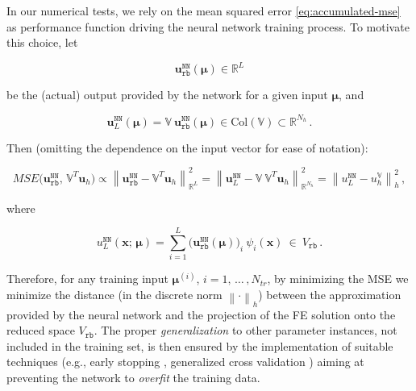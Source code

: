 \documentclass[longtitle]{elsarticle}
\numberwithin{equation}{section}
\theoremstyle{theorem}
\theoremstyle{definition}
\theoremstyle{remark}
\theoremstyle{proposition}
\numberwithin{figure}{section}
\newcommand{\norm}[1]{\left\lVert#1\right\rVert}
\newcommand{\bg}[1]{\boldsymbol{#1}}
\begin{document}
		In our numerical tests, we rely on the mean squared error \eqref{eq:accumulated-mse} as performance function driving the neural network training process. To motivate this choice, let 
		\begin{linenomath}\begin{equation*}
			\mathbf{u}_{\texttt{rb}}^{\texttt{NN}}(\bg{\mu}) \in \mathbb{R}^L
		\end{equation*}\end{linenomath}
		be the (actual) output provided by the network for a given input $\bg{\mu}$, and 
		\begin{linenomath}\begin{equation*}
			\mathbf{u}_L^{\texttt{NN}}(\bg{\mu}) = \mathbb{V} ~ \mathbf{u}_{\texttt{rb}}^{\texttt{NN}}(\bg{\mu}) \in \text{Col}(\mathbb{V}) \subset \mathbb{R}^{N_h} \, . 
		\end{equation*}\end{linenomath}
		Then (omitting the dependence on the input vector for ease of notation):
		\begin{linenomath}\begin{equation*}
				MSE \big( \mathbf{u}_{\texttt{rb}}^{\texttt{NN}}, \, \mathbb{V}^T \mathbf{u}_h \big) \propto \norm{\mathbf{u}_{\texttt{rb}}^{\texttt{NN}} - \mathbb{V}^T \mathbf{u}_h}^2_{\mathbb{R}^L} = \norm{\mathbf{u}_L^{\texttt{NN}} - \mathbb{V} ~ \mathbb{V}^T \mathbf{u}_h}^2_{\mathbb{R}^{N_h}} = \norm{u_L^{\texttt{NN}} - u_h^{\mathbb{V}}}^2_h \, ,
		\end{equation*}\end{linenomath} 
		where
		\begin{linenomath}\begin{equation*}
			\label{eq:pod-nn-solution}
			u_L^{\texttt{NN}}(\bg{x}; \, \bg{\mu}) = \sum_{i = 1}^L \big( \mathbf{u}_{\texttt{rb}}^{\texttt{NN}}(\bg{\mu}) \big)_i ~ \psi_i(\bg{x}) ~ \in ~ V_{\texttt{rb}} \, .
		\end{equation*}\end{linenomath}
		Therefore, for any training input $\bg{\mu}^{(i)}$, $i = 1, \, \ldots \, , N_{tr}$, by minimizing the MSE we minimize the distance (in the discrete norm $\norm{\cdot}_h$) between the approximation provided by the neural network and the projection of the FE solution onto the reduced space $V_{\texttt{rb}}$. The proper \emph{generalization} to other parameter instances, not included in the training set, is then ensured by the implementation of suitable techniques (e.g., early stopping \cite{Mat16}, generalized cross validation \cite{Koh95}) aiming at preventing the network to \emph{overfit} the training data.
		
\end{document}

